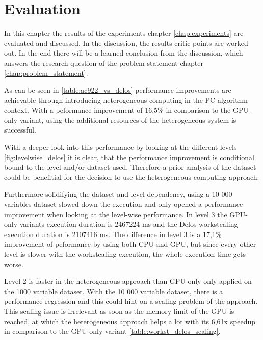 \chapter{Evaluation}
In this chapter the results of the experiments chapter \ref{chap:experiments} are evaluated and discussed. In the discussion, the results critic points are worked out. In the end there will be a learned conclusion from the discussion, which answers the research question of the problem statement chapter \ref{chap:problem_statement}.

% 
As can be seen in \ref{table:ac922_vs_delos} performance improvements are achievable through introducing heterogeneous computing in the PC algorithm context. With a peformance improvement of 16,5\% in comparison to the GPU-only variant, using the additional resources of the heterogeneous system is successful.

With a deeper look into this performance by looking at the different levels \ref{fig:levelwise_delos} it is clear, that the performance improvement is conditional bound to the level and/or dataset used. Therefore a prior analysis of the dataset could be benefitial for the decision to use the heterogeneous computing approach.

Furthermore solidifying the dataset and level dependency, using a 10 000 variables dataset slowed down the execution and only opened a performance improvement when looking at the level-wise performance. In level 3 the GPU-only variants execution duration is 2467224 ms and the Delos workstealing execution duration is 2107416 ms.
The difference in level 3 is a 17,1\% improvement of peformance by using both CPU and GPU, but since every other level is slower with the workstealing execution, the whole execution time gets worse.

Level 2 is faster in the heterogeneous approach than GPU-only only applied on the 1000 variable dataset. With the 10 000 variable dataset, there is a performance regression and this could hint on a scaling problem of the approach.
This scaling issue is irrelevant as soon as the memory limit of the GPU is reached, at which the heterogeneous approach helps a lot with its 6,61x speedup in comparison to the GPU-only variant \ref{table:workst_delos_scaling}.


